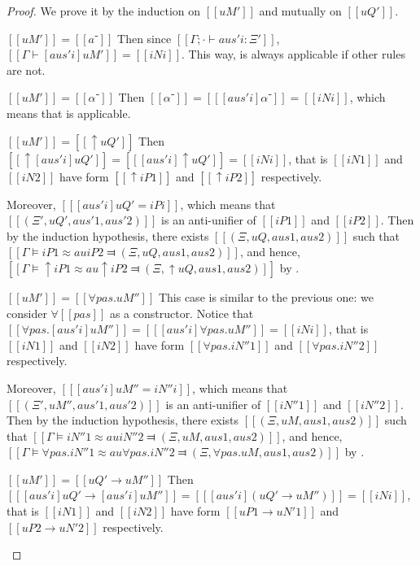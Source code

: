 \begin{proof}
    We prove it by the induction on $[[uM']]$ and mutually on $[[uQ']]$.
    \begin{caseof}
        \item $[[uM']] = [[â⁻]]$ 
            Then since $[[Γ ; · ⊢ aus'i : Ξ']]$,
            $[[Γ ⊢ [aus'i] uM']] = [[ iNi ]]$. 
            This way,  is always applicable
            if other rules are not.

        \item $[[uM']] = [[α⁻]]$
            Then $[[α⁻]] = [[ [aus'i] α⁻]] = [[ iNi ]]$, which means
            that  is applicable.

        \item $[[uM']] = [[↑uQ']]$
            Then $[[ ↑[aus'i]uQ']] = [[ [aus'i]↑uQ']] = [[ iNi ]]$, that is
            $[[iN1]]$ and $[[iN2]]$ have form $[[↑iP1]]$ and $[[↑iP2]]$ respectively.

            Moreover, $[[ [aus'i]uQ' = iPi ]]$, which means that 
            $[[(Ξ', uQ', aus'1, aus'2)]]$ is an anti-unifier of $[[iP1]]$ and $[[iP2]]$.
            Then by the induction hypothesis, there exists $[[(Ξ, uQ, aus1, aus2)]]$ such that
            $[[Γ ⊨ iP1 ≈au iP2 ⫤ (Ξ, uQ, aus1, aus2)]]$, and hence, 
            $[[Γ ⊨ ↑iP1 ≈au ↑iP2 ⫤ (Ξ, ↑uQ, aus1, aus2)]]$ by .
        \item $[[uM']] = [[∀pas.uM'']]$ This case is similar to the previous one:
            we consider $\forall[[pas]]$ as a constructor. 
            Notice that $[[∀pas.[aus'i]uM'']] = [[ [aus'i]∀pas.uM'']] = [[ iNi ]]$, that is
            $[[iN1]]$ and $[[iN2]]$ have form $[[∀pas.iN''1]]$ and $[[∀pas.iN''2]]$ respectively.

            Moreover, $[[ [aus'i]uM'' = iN''i ]]$, which means that
            $[[(Ξ', uM'', aus'1, aus'2)]]$ is an anti-unifier of $[[iN''1]]$ and $[[iN''2]]$.
            Then by the induction hypothesis, there exists $[[(Ξ, uM, aus1, aus2)]]$ such that
            $[[Γ ⊨ iN''1 ≈au iN''2 ⫤ (Ξ, uM, aus1, aus2)]]$, and hence,
            $[[Γ ⊨ ∀pas.iN''1 ≈au ∀pas.iN''2 ⫤ (Ξ, ∀pas.uM, aus1, aus2)]]$ by 
            .
        \item $[[uM']] = [[uQ' → uM'']]$
            Then $[[ [aus'i]uQ' → [aus'i]uM'']] = [[ [aus'i](uQ' → uM'')]] = [[ iNi ]]$, that is
            $[[iN1]]$ and $[[iN2]]$ have form $[[uP1 → uN'1]]$ and $[[uP2 → uN'2]]$ respectively.


\end{caseof}
\end{proof}
